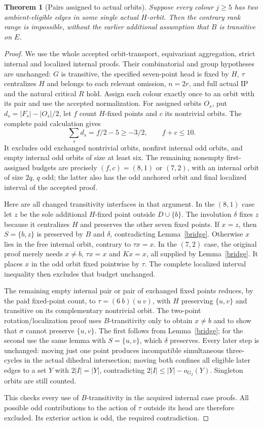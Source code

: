 \documentclass[11pt,a4paper]{article}
\newtheorem{theorem}[lemma]{Theorem}
\begin{document}
\begin{theorem}[Pairs assigned to actual orbits]\label{assigned}
Suppose every colour $j\ge5$ has two ambient-eligible edges in
some single actual $H$-orbit. Then the contrary rank range is
impossible, without the earlier additional assumption that $B$
is transitive on $E$.
\end{theorem}
\begin{proof}
We use the whole accepted orbit-transport, equivariant aggregation,
strict internal and localized internal proofs. Their combinatorial
and group hypotheses are unchanged: $G$ is transitive, the specified
seven-point head is fixed by $H$, $\tau$ centralizes $H$ and
belongs to each relevant omission, $n=2r$, and full actual IP and
the natural critical $R$ hold. Assign each colour exactly once
to an orbit with its pair and use the accepted normalization.
For assigned orbits $O_s$, put $d_s=|F_s|-|O_s|/2$, let $f$
count $H$-fixed points and $c$ its nontrivial orbits. The complete
paid calculation gives
\[
 \sum_s d_s=f/2-5\ge-3/2,\qquad f+c\le10.
\]
It excludes odd exchanged nontrivial orbits, nonfirst internal
odd orbits, and empty internal odd orbits of size at least six.
The remaining nonempty first-assigned budgets are precisely
$(f,c)=(8,1)$ or $(7,2)$, with an internal orbit of size $2q$,
$q$ odd; the latter also has the odd anchored orbit and final
localized interval of the accepted proof.

Here are all changed transitivity interfaces in that argument.
In the $(8,1)$ case let $z$ be the sole additional $H$-fixed point
outside $D\cup\{b\}$. The involution $\delta$ fixes $z$ because
it centralizes $H$ and preserves the other seven fixed points.
If $x=z$, then $S=\{b,z\}$ is preserved by $B$ and $\delta$,
contradicting Lemma~\ref{bridge}. Otherwise $x$ lies in the free
internal orbit, contrary to $\tau x=x$. In the $(7,2)$ case,
the original proof merely needs $x\ne b$, $\tau x=x$ and
$Kx=x$, all supplied by Lemma~\ref{bridge}. It places $x$ in
the odd orbit fixed pointwise by $\tau$. The complete localized
interval inequality then excludes that budget unchanged.

The remaining empty internal pair or pair of exchanged fixed points
reduces, by the paid fixed-point count, to
$\tau=(6\ b)(u\ v)$, with $H$ preserving $\{u,v\}$ and
transitive on its complementary nontrivial orbit. The two-point
rotation/localization proof uses $B$-transitivity only to obtain
$x\ne b$ and to show that $\sigma$ cannot preserve $\{u,v\}$.
The first follows from Lemma~\ref{bridge}; for the second use the
same lemma with $S=\{u,v\}$, which $\delta$ preserves.
Every later step is unchanged: moving just one point produces
incompatible simultaneous three-cycles in the actual dihedral
intersection; moving both confines all eligible later edges to
a set $Y$ with $2|I|=|Y|$, contradicting
$2|I|\le |Y|-o_{G_I}(Y)$. Singleton orbits are still counted.

This checks every use of $B$-transitivity in the acquired internal
case proofs. All possible odd contributions to the action of
$\tau$ outside its head are therefore excluded. Its exterior
action is odd, the required contradiction.
\end{proof}
\end{document}
